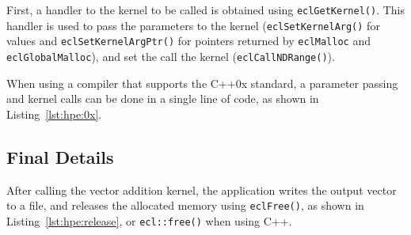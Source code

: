 First, a handler to the kernel to be called is obtained using \texttt{eclGetKernel()}. This handler 
is used to pass the parameters to the kernel (\texttt{eclSetKernelArg()} for values and 
\texttt{eclSetKernelArgPtr()} for pointers returned by \texttt{eclMalloc} and 
\texttt{eclGlobalMalloc}), and set the call the kernel (\texttt{eclCallNDRange()}).

When using a compiler that supports the C++0x standard, a parameter passing and kernel calls can be 
done in a single line of code, as shown in Listing~\ref{lst:hpe:0x}.



\subsection{Final Details}
After calling the vector addition kernel, the application writes the output vector to a file, and 
releases the allocated memory using \texttt{eclFree()}, as shown in Listing~\ref{lst:hpe:release}, 
or \texttt{ecl::free()} when using C++.





